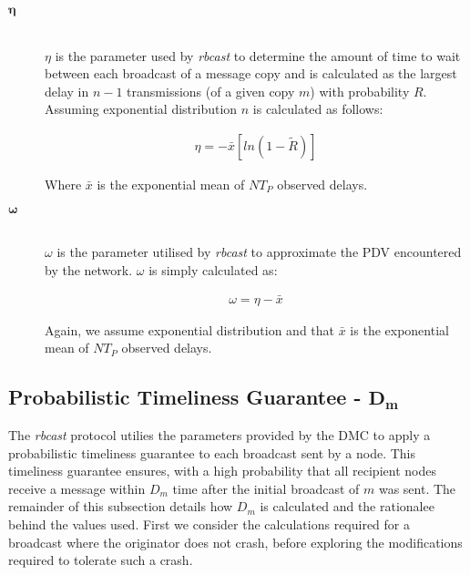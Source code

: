 \begin{description}
        \item[\Huge$\boldsymbol{\eta}$] \hfill \\
        $\eta$ is the parameter used by \emph{rbcast} to determine the amount of time to wait between each broadcast of a message copy and is calculated as the largest delay in $n - 1$ transmissions (of a given copy $m$) with probability $R$.  Assuming exponential distribution $n$ is calculated as follows:
        
        \begin{equation*}
            \begin{aligned}
                \eta=-\bar{x}[ln(1-\tilde{R})]  
            \end{aligned}
        \end{equation*}
        
Where $\bar{x}$ is the exponential mean of $NT_P$ observed delays.

        \item[\Huge$\boldsymbol{\omega}$] \hfill \\
        $\omega$ is the parameter utilised by \emph{rbcast} to approximate the PDV encountered by the network.  $\omega$ is simply calculated as:
        
        \begin{equation*}
            \begin{aligned}
                \omega = \eta - \bar{x}
            \end{aligned}
        \end{equation*}        
        
        Again, we assume exponential distribution and that $\bar{x}$ is the exponential mean of $NT_P$ observed delays.
        \end{description}

        \subsection*{Probabilistic Timeliness Guarantee - $\boldsymbol{D_m}$}
        The \emph{rbcast} protocol utilies the parameters provided by the DMC to apply a probabilistic timeliness guarantee to each broadcast sent by a node.  This timeliness guarantee ensures, with a high probability that all recipient nodes receive a message within $D_m$ time after the initial broadcast of $m$ was sent.  The remainder of this subsection details how $D_m$ is calculated and the rationalee behind the values used.  First we consider the calculations required for a broadcast where the originator does not crash, before exploring the modifications required to tolerate such a crash.  

